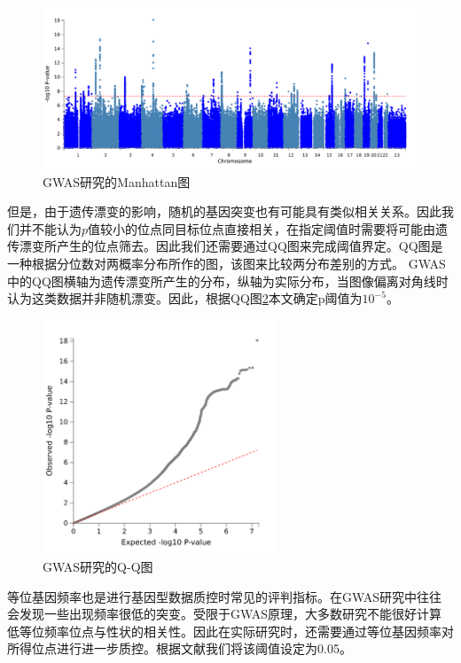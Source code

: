 \begin{figure}[!ht]
\centering
\includegraphics[width=\textwidth]{figures/Chapter2/Maha.png}
\caption{GWAS研究的Manhattan图} \label{fig:manhattan}
\end{figure}

但是，由于遗传漂变的影响，随机的基因突变也有可能具有类似相关关系。因此我们并不能认为$p$值较小的位点同目标位点直接相关，在指定阈值时需要将可能由遗传漂变所产生的位点筛去。因此我们还需要通过QQ图来完成阈值界定。QQ图是一种根据分位数对两概率分布所作的图，该图来比较两分布差别的方式\cite{wilk_probability_1968}。 GWAS中的QQ图横轴为遗传漂变所产生的分布，纵轴为实际分布，当图像偏离对角线时认为这类数据并非随机漂变。因此，根据QQ图\ref{fig:qqplot}本文确定p阈值为$10^{-5}$。

\begin{figure}[!ht]
\centering
\includegraphics[width=7cm]{figures/Chapter2/qq.png}
\caption{GWAS研究的Q-Q图} \label{fig:qqplot}
\end{figure}


等位基因频率也是进行基因型数据质控时常见的评判指标。在GWAS研究中往往会发现一些出现频率很低的突变。受限于GWAS原理，大多数研究不能很好计算低等位频率位点与性状的相关性。因此在实际研究时，还需要通过等位基因频率对所得位点进行进一步质控。根据文献我们将该阈值设定为0.05\cite{marees_tutorial_2018}。

